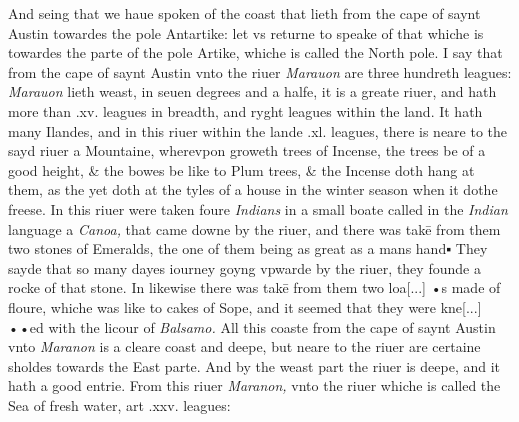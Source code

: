 \documentclass[11pt,twoside]{article}\makeatletter
\def\gap{}
\begin{document}
And seing that we haue spoken of the coast that lieth from the cape of saynt Austin towardes the pole Antartike: let vs returne to speake of that whiche is towardes the parte of the pole Artike, whiche is called the North pole. I say that from the cape of saynt Austin vnto the riuer {\itshape Marauon} are three hundreth leagues: {\itshape Marauon} lieth weast, in seuen de­grees 
	\normalmarginpar
       and a halfe, it is a greate riuer, and hath more than .xv. leagues in breadth, and ryght leagues within the land. It hath many Ilandes, and in this riuer within the lande .xl. leagues, there is neare to the sayd riuer a Mountaine, where­vpon groweth trees of Incense, the trees be of a good height, \& the bowes be like to Plum trees, \& the Incense doth hang at them, as the yet doth at the tyles of a house in the winter season when it dothe freese. In this riuer were taken foure {\itshape In­dians} in a small boate called in the {\itshape Indian} language a {\itshape Canoa,} that came downe by the riuer, and there was takē from them two stones of Emeralds, the one of them being as great as a mans hand▪ They sayde that so many dayes iourney goyng vpwarde by the riuer, they founde a rocke of that stone. In likewise there was takē from them two loa[...] {\gap •}s made of floure, whiche was like to cakes of Sope, and it seemed that they were kne[...] {\gap ••}ed with the licour of {\itshape Balsamo.} All this coaste %
 from the cape of saynt Austin vnto {\itshape Maranon} is a cleare coast and deepe, but neare to the riuer are certaine sholdes towards the East parte. And by the weast part the riuer is deepe, and it hath a good entrie. From this riuer {\itshape Maranon,} vnto the ri­uer whiche is called the Sea of fresh water, art .xxv. leagues: 
	\normalmarginpar
\end{document}
